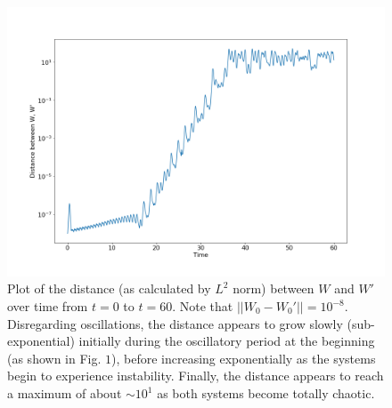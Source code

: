 \documentclass{article}
\begin{document}
\begin{figure}
    \hspace{-25mm}
    \includegraphics[scale=0.6]{w_prime_distance.png}
    \caption{Plot of the distance (as calculated by $L^2$ norm) between $W$ and $W'$ over time from $t = 0$ to $t = 60$. Note that $||W_0 - W_0'|| = 10^{-8}$. Disregarding oscillations, the distance appears to grow slowly (sub-exponential) initially during the oscillatory period at the beginning (as shown in Fig. $1$), before increasing exponentially as the systems begin to experience instability. Finally, the distance appears to reach a maximum of about $\sim 10^1$ as both systems become totally chaotic.}
    \label{fig:w_prime_distance}
\end{figure}
\end{document}
